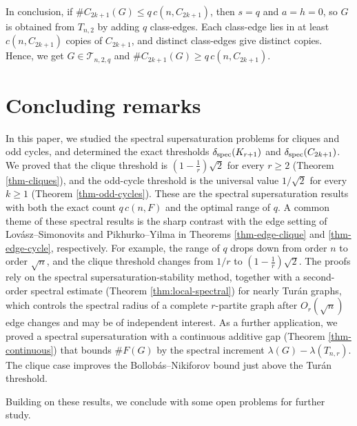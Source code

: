 \documentclass[11pt,a4paper]{article}
\theoremstyle{definition}
\theoremstyle{plain}
\renewcommand{\le}{\leqslant}
\renewcommand{\ge}{\geqslant}
\begin{document}
In conclusion, if $\texttt{\#}C_{2k+1}(G)\le
q\,c(n,C_{2k+1})$, then $s=q$ and $a=h=0$, so $G$ is
obtained from $T_{n,2}$ by adding $q$ class-edges.
Each class-edge lies in at least $c(n,C_{2k+1})$
 copies of $C_{2k+1}$, and distinct
class-edges give distinct copies. Hence, we get $G\in\mathcal T_{n,2,q}$ and 
$\texttt{\#}C_{2k+1}(G)\ge q\,c(n,C_{2k+1})$. 







\section{Concluding remarks}

\label{sec-concluding-remark}

In this paper, we studied the 
spectral supersaturation problems for cliques and
odd cycles, and determined the exact thresholds $\delta_{\rm spec}(K_{r+1})$ and
$\delta_{\rm spec}(C_{2k+1})$. 
We proved that the clique threshold is
$(1-\frac1r)\sqrt2$ for every $r\ge 2$ (Theorem \ref{thm-cliques}), and the odd-cycle threshold is the
universal value $1/\sqrt2$ for every $k\ge 1$ (Theorem
\ref{thm-odd-cycles}). These are the spectral supersaturation results with both the exact count $q\,c(n,F)$ and the optimal range of $q$. 
A common theme of
these spectral results is the sharp contrast with the edge setting of Lov\'asz--Simonovits and Pikhurko--Yilma in Theorems \ref{thm-edge-clique} and \ref{thm-edge-cycle}, respectively. For example,
 the range of $q$ drops down from order $n$ to order $\sqrt n$, and the clique threshold changes from
$1/r$ to $(1 \!-\! \frac1r)\sqrt2$. 
The proofs rely on the spectral supersaturation-stability method, together with a second-order spectral estimate (Theorem \ref{thm:local-spectral})  for nearly Tur\'an graphs, which controls the spectral radius of a complete $r$-partite graph after $O_r(\sqrt n)$ edge changes and may be of independent interest. As a further application, we proved a spectral supersaturation with a continuous additive gap (Theorem \ref{thm-continuous}) that bounds $\texttt{\#}F(G)$ by
the spectral increment $\lambda(G)-\lambda(T_{n,r})$. The clique case improves the
Bollob\'as--Nikiforov bound just above the Tur\'an threshold. 


\smallskip 
Building on these results, we conclude with some open problems for further study.
\end{document}
